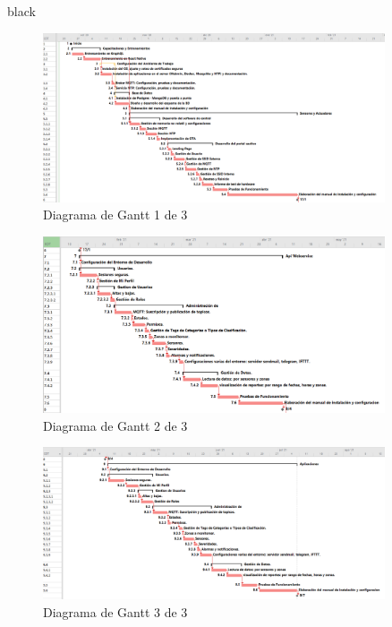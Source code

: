 \documentclass[11pt]{charter}
\begin{document}
\begin{consigna}{black}
\begin{figure}[htpb]
	\centering 
	\includegraphics[width=0.9\textwidth]{./Figuras/gantt01.png}
	\caption{Diagrama de Gantt 1 de 3}
	\label{fig:gantt01}
\end{figure}
\vspace{5px}
\newpage
\vspace*{2px}
\begin{figure}[htpb]
	\centering 
	\includegraphics[width=0.9\textwidth]{./Figuras/gantt02.png}
	\caption{Diagrama de Gantt 2 de 3}
	\label{fig:gantt02}
\end{figure}
\vspace{5px}
\newpage
\vspace*{2px}
\begin{figure}[htpb]
	\centering 
	\includegraphics[width=0.9\textwidth]{./Figuras/gantt03.png}
	\caption{Diagrama de Gantt 3 de 3}
	\label{fig:gantt03}
\end{figure}
\vspace{5px}
\newpage

\end{consigna}
\end{document}
